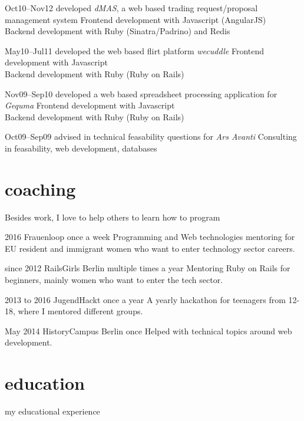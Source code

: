 \documentclass[]{friggeri-cv}
\begin{document}
\begin{entrylist}
  \entry
    {Oct10–Nov12}
    {developed \emph{dMAS}, a web based trading request/proposal management system}
    {}
    {Frontend development with Javascript (AngularJS)\\
     Backend development with Ruby (Sinatra/Padrino) and Redis}

  \entry
    {May10–Jul11}
    {developed the web based flirt platform \emph{wecuddle}}
    {}
    {Frontend development with Javascript\\
     Backend development with Ruby (Ruby on Rails)}

  \entry
    {Nov09–Sep10}
    {developed a web based spreadsheet processing application for \emph{Gequma}}
    {}
    {Frontend development with Javascript\\
     Backend development with Ruby (Ruby on Rails)}

  \entry
    {Oct09–Sep09}
    {advised in technical feasability questions for \emph{Ars Avanti}}
    {}
    {Consulting in feasability, web development, databases}


\end{entrylist}


\pagebreak
\section{coaching}
Besides work, I love to help others to learn how to program

\begin{entrylist}
  \entry
    {2016}
    {Frauenloop}
    {once a week}
    {Programming and Web technologies mentoring for EU resident and immigrant women who want to enter technology sector careers.}

  \entry
    {since 2012}
    {RailsGirls Berlin}
    {multiple times a year}
    {Mentoring Ruby on Rails for beginners, mainly women who want to enter the tech sector.}

  \entry
    {2013 to 2016}
    {JugendHackt}
    {once a year}
    {A yearly hackathon for teenagers from 12-18, where I mentored different groups.}

  \entry
    {May 2014}
    {HistoryCampus Berlin}
    {once}
    {Helped with technical topics around web development.}

\end{entrylist}


\section{education}
my educational experience
\end{document}
